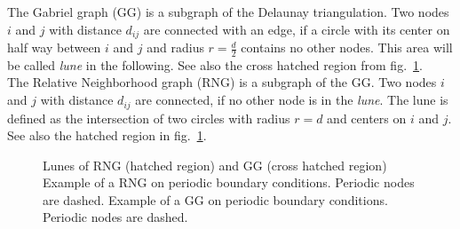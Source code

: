     The Gabriel graph (GG) \cite{Gabriel1969} is a subgraph of the
    Delaunay triangulation. Two nodes \(i\) and \(j\) with distance
    \(d_{ij}\) are connected with an edge, if a circle with its
    center on half way between \(i\) and \(j\) and radius
    \(r = \frac d 2\) contains no other nodes. This area will be
    called \emph{lune} in the following. See also the cross hatched region
    from fig.\ \ref{fig:lunes}.\\
    The Relative Neighborhood graph (RNG) \cite{Toussaint1980} is a
    subgraph of the GG. Two nodes \(i\) and \(j\) with
    distance \(d_{ij}\) are connected, if no other node is in the
    \emph{lune}. The lune is defined as the intersection of two
    circles with radius \(r = d\) and centers on \(i\) and \(j\).
    See also the hatched region in fig.\ \ref{fig:lunes}.
    \begin{figure}[htbp]
        \centering
        \caption[Gabriel - and Relative Neighborhood Graph]
        {
             Lunes of RNG (hatched region) and
                GG (cross hatched region)
             Example of a RNG on periodic
                boundary conditions. Periodic nodes are dashed.
             Example of a GG on
                periodic boundary conditions. Periodic nodes are dashed.
        }
        \label{fig:lunes}
    \end{figure}\\
